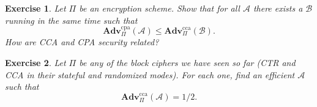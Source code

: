 \documentclass[11pt]{article}
\newtheorem{exercise}{Exercise}
\newcommand{\calA}{\mathcal{A}}
\newcommand{\calB}{\mathcal{B}}
\newcommand{\Adv}{\mathbf{Adv}}
\newcommand{\AdvCPA}[2]{\Adv^{\mathrm{cpa}}_{#1}({#2})}
\newcommand{\AdvCCA}[2]{\Adv^{\mathrm{cca}}_{#1}({#2})}
\begin{document}
\begin{exercise}
    Let $\Pi$ be an encryption scheme. Show that for all $\calA$ there exists
    a $\calB$ running in the same time such that
    \[
        \AdvCPA{\Pi}{\calA} \leq \AdvCCA{\Pi}{\calB}.
    \]
    How are CCA and CPA security related?
\end{exercise}

\begin{exercise}
    Let $\Pi$ be any of the block ciphers we have seen so far (CTR and CCA in
    their stateful and randomized modes). For each one, find an efficient
    $\calA$ such that
    \[
        \AdvCCA{\Pi}{\calA} = 1/2.
    \]
\end{exercise}
\end{document}

